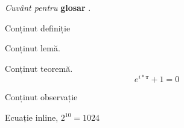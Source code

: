\textit{Cuvânt pentru} \textbf{glosar} .	

\begin{definition}
	Conținut definiție
\end{definition}

\begin{lemma}
	Conținut lemă.
\end{lemma}

\begin{theorem}
	Conținut teoremă.
	\[
		e^{i * \pi} + 1 = 0
	\]
\end{theorem}

\begin{remark}
	Conținut observație
\end{remark}

Ecuație inline, $2^{10} = 1024 $
